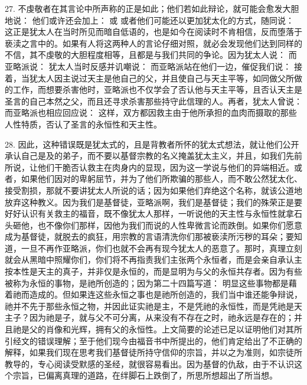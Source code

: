 27. 不虔敬者在其言论中所声称的正是如此；他们若如此辩论，就可能会愈发大胆地说： 他们或许还会加上： 或  或者他们可能还以更加犹太化的方式，随同说： 这正是犹太人在当时所见而暗自低语的，也是如今在阅读时不肯相信，反而堕落于亵渎之言中的。如果有人将这两种人的言论仔细对照，就必会发现他们达到同样的不信，其不虔敬的大胆程度相等，且都是与我们共同的争论。因为犹太人说： 而亚略派说： 犹太人当时反感并讥嘲说： 而亚略派站在他们一边，催促我们说： 接着，当犹太人因主说过天主是他自己的父，并且使自己与天主平等，如同做父所做的工作，而想要杀害他时，亚略派也不仅学会了否认他与天主平等，且否认天主是圣言的自己本然之父，而且还寻求杀害那些持守此信理的人。再者，犹太人曾说： 而亚略派也相应回应说： 这样，双方都因救主由于他所承担的血肉而摄取的那些人性特质，否认了圣言的永恒性和天主性。\par

28. 因此，这种错误既是犹太式的，且是背教者所怀的犹太式想法，就让他们公开承认自己是及的弟子，而不要以基督宗教的名义掩盖犹太主义，并且，如我们先前所说，让他们干脆否认救主在肉身内的显现，因为这一学说与他们的异端相近。或者，如果他们因对的卑躬屈节，并为了他们所欺骗的那些人，而不敢公然犹太化、接受割损，那就不要讲犹太人所说的话；因为如果他们弃绝这个名称，就该公道地放弃这种教义。因为我们是基督徒，亚略派啊，我们是基督徒；我们的殊荣正是要好好认识有关救主的福音，既不像犹太人那样，一听说他的天主性与永恒性就拿石头砸他，也不像你们那样，因他为我们而说的人性卑微言论而跌倒。如果你们愿意成为基督徒，就脱去的疯狂，用宗教的言语清洗你们那被亵渎所污秽的耳朵；要知道，一旦不再作亚略派，你们也就不会再有现今犹太人的恶意了。那时，真理立刻就会从黑暗中照耀你们，你们将不再指责我们主张两个永恒者，而是会亲自承认主按本性是天主的真子，并非仅是永恒的，而是显明为与父的永恒共存者。因为有些被称为永恒的事物，是祂所创造的；因为第二十四篇写道： 明显这些事物都是藉着祂而造成的。但如果连这些永恒之事也是祂所创造的，我们当中谁还能争辩说，祂并不先于那些永恒之物，并因此证实祂是主，不是凭祂的永恒性，而是凭祂是天主子？因为祂是子，就与父不可分离，从来没有不存在之时，祂永远是存在的；并且祂是父的肖像和光辉，拥有父的永恒性。上文简要的论述已足以证明他们对其所引经文的错误理解；至于他们现今由福音书中所提出的，他们肯定给出了不正确的解释，如果我们现在思考我们基督徒所持守信仰的宗旨，并以之为准则，如宗徒所教导的，专心阅读受默感的圣经，就很容易看出。因为基督的仇敌，由于不认识这个宗旨，已偏离真理的道路，在绊脚石上跌倒了，所思所想超出了所当想。\par

